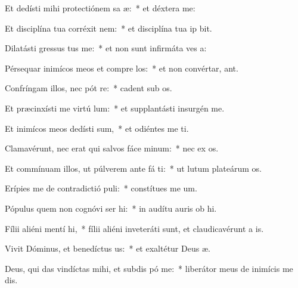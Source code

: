 \item Et dedísti mihi protectiónem sa æ:~* et déxtera   me:
\item Et disciplína tua corréxit   nem:~* et disciplína tua ip  bit.
\item Dilatásti gressus  tus me:~* et non sunt infirmáta ves a:
\item Pérsequar inimícos meos et compre los:~* et non convértar,  ant.
\item Confríngam illos, nec pót re:~* cadent sub  os.
\item Et præcinxísti me virtú  lum:~* et supplantásti insurgén    me.
\item Et inimícos meos dedísti  sum,~* et odiéntes me ti.
\item Clamavérunt, nec erat qui salvos fáce  minum:~* nec ex os.
\item Et commínuam illos, ut púlverem ante fá ti:~* ut lutum plateárum  os.
\item Erípies me de contradictió puli:~* constítues me   um.
\item Pópulus quem non cognóvi ser hi:~* in audítu auris ob hi.
\item Fílii aliéni mentí  hi,~* fílii aliéni inveteráti sunt, et claudicavérunt a  is.
\item Vivit Dóminus, et benedíctus  us:~* et exaltétur Deus  æ.
\item Deus, qui das vindíctas mihi, et subdis pó  me:~* liberátor meus de inimícis me dis.
